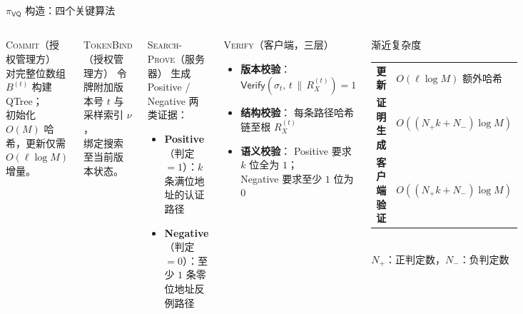 \begin{frame}{$\pi_\mathsf{VQ}$ 构造：四个关键算法}

  \begin{columns}[T]
      \begin{block}{\textsc{Commit}（授权管理方）}
        \small
        对完整位数组 $B^{(t)}$ 构建 QTree；\\
        初始化 $O(M)$ 哈希，更新仅需 $O(\ell \log M)$ 增量。
      \end{block}

      \begin{block}{\textsc{TokenBind}（授权管理方）}
        \small
        令牌附加版本号 $t$ 与采样索引 $\nu$，\\
        绑定搜索至当前版本状态。
      \end{block}

      \begin{block}{\textsc{Search-Prove}（服务器）}
        \small
        生成 Positive / Negative 两类证据：
        \begin{itemize}
          \item \textbf{Positive}（判定$=1$）：$k$ 条满位地址的认证路径
          \item \textbf{Negative}（判定$=0$）：至少 $1$ 条零位地址反例路径
        \end{itemize}
      \end{block}

      \begin{block}{\textsc{Verify}（客户端，三层）}
        \small
        \begin{itemize}
          \item[1.] \textbf{版本校验}：
                $\mathsf{Verify}(\sigma_t,\, t \,\|\, R_X^{(t)}) = 1$
          \item[2.] \textbf{结构校验}：
                每条路径哈希链至根 $R_X^{(t)}$
          \item[3.] \textbf{语义校验}：
                Positive 要求 $k$ 位全为 $1$；\\
                Negative 要求至少 $1$ 位为 $0$
        \end{itemize}
      \end{block}

      \vspace{0.4em}
      \begin{exampleblock}{渐近复杂度}
        \small
        \begin{tabular}{ll}
          \textbf{更新} & $O(\ell \log M)$ 额外哈希 \\
          \textbf{证明生成} & $O((N_+ k + N_-)\log M)$ \\
          \textbf{客户端验证} & $O((N_+ k + N_-)\log M)$ \\
        \end{tabular}
        \vspace{0.2em}\\
        \small $N_+$：正判定数，$N_-$：负判定数
      \end{exampleblock}
  \end{columns}

\end{frame}
